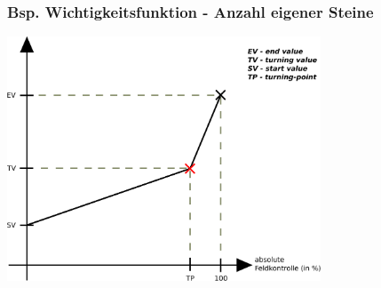 \documentclass{beamer}
\begin{document}
\begin{frame}
\frametitle{Bsp. Wichtigkeitsfunktion - Anzahl eigener Steine}
\centering
\includegraphics[width = 0.7\textwidth]{ImportanceFunctionGraph.pdf}
\end{frame}

\end{document}
